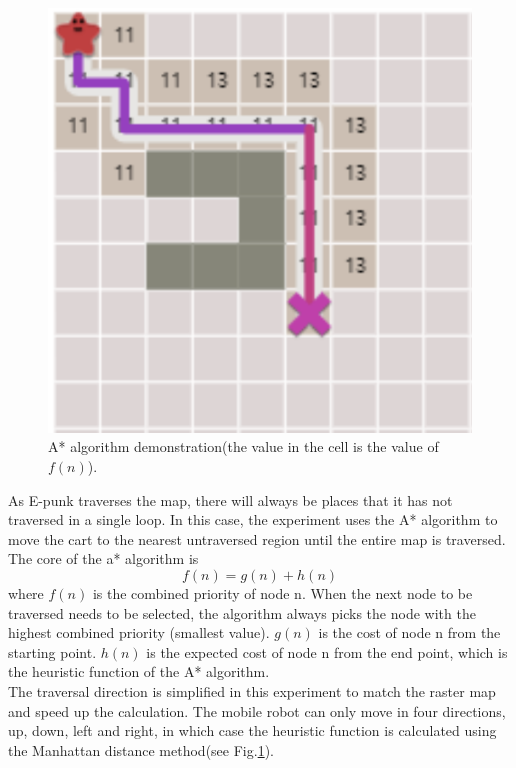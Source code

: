 \documentclass[conference]{IEEEtran}
\begin{document}
\begin{figure}[htbp]
\centerline{\includegraphics[scale=0.45]{RS_Report/astar.png}}
\caption{A* algorithm demonstration(the value in the cell is the value of $f(n)$).}
\label{fig4}
\end{figure}

As E-punk traverses the map, there will always be places that it has not traversed in a single loop. In this case, the experiment uses the A* algorithm to move the cart to the nearest untraversed region until the entire map is traversed.\\
The core of the a* algorithm is
\begin{equation}
  f(n) = g(n) + h(n)
\end{equation}
where $f(n)$ is the combined priority of node n. When the next node to be traversed needs to be selected, the algorithm always picks the node with the highest combined priority (smallest value). $g(n)$ is the cost of node n from the starting point. $h(n)$ is the expected cost of node n from the end point, which is the heuristic function of the A* algorithm.\\
The traversal direction is simplified in this experiment to match the raster map and speed up the calculation. The mobile robot can only move in four directions, up, down, left and right, in which case the heuristic function is calculated using the Manhattan distance method(see Fig.\ref{fig4}).
\end{document}
